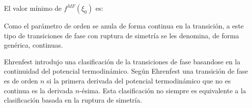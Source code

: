 El valor mínimo de $f^{MF}(\xi_0)$ es:

Como el parámetro de orden se anula de forma continua en la transición, a este
tipo de transiciones de fase con ruptura de simetría se les denomina, de forma
genérica, continuas.

Ehrenfest introdujo una clasificación de la transiciones de fase basandose en
la continuidad del potencial termodinámico. Según Ehrenfest una transición de
fase es de orden $n$ si la primera derivada del potencial termodinámico que no
es continua es la derivada $n$-ésima. Esta clasificación no siempre es
equivalente a la clasificación basada en la ruptura de simetría.
 
